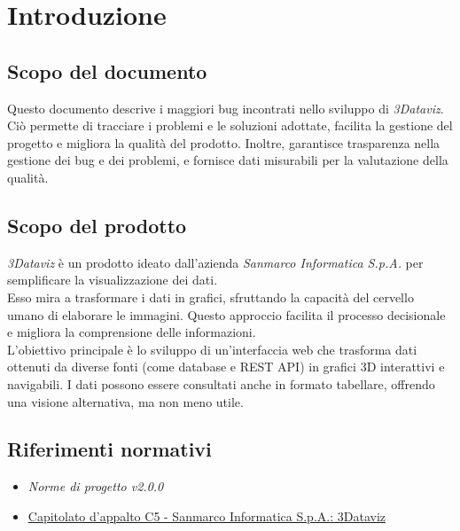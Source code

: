 \section{Introduzione}
\subsection{Scopo del documento}
Questo documento descrive i maggiori bug incontrati nello sviluppo di \textit{3Dataviz}.
Ciò permette di tracciare i problemi e le soluzioni adottate, facilita la gestione del progetto e migliora la qualità del prodotto.
Inoltre, garantisce trasparenza nella gestione dei bug e dei problemi, e fornisce dati misurabili per la valutazione della qualità.

\subsection{Scopo del prodotto}
\textit{3Dataviz} è un prodotto ideato dall'azienda \textit{Sanmarco Informatica S.p.A.} per semplificare la visualizzazione dei dati.\\
Esso mira a trasformare i dati in grafici, sfruttando la capacità del cervello umano di elaborare le immagini. 
Questo approccio facilita il processo decisionale e migliora la comprensione delle informazioni.\\
L'obiettivo principale è lo sviluppo di un'interfaccia web che trasforma dati ottenuti da diverse fonti (come database e REST API) in grafici 3D interattivi e navigabili. 
I dati possono essere consultati anche in formato tabellare, offrendo una visione alternativa, ma non meno utile.  

\subsection{Riferimenti normativi}
\begin{itemize}
      \item {\textit{Norme di progetto v2.0.0}}
      \item \href{https://www.math.unipd.it/~tullio/IS-1/2024/Progetto/C5.pdf}
            {Capitolato d'appalto C5 - Sanmarco Informatica S.p.A.: 3Dataviz}
\end{itemize}
